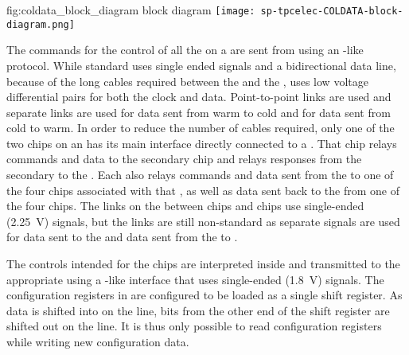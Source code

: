 \begin{dunefigure}
{fig:coldata_block_diagram}
{ block diagram}
\texttt{[image: sp-tpcelec-COLDATA-block-diagram.png]}
\end{dunefigure}

The commands for the control of all the  on a  are sent 
from  using an -like~\cite{i2c} protocol. While standard 
 uses single ended  signals and a bidirectional data 
line, because of the long cables required between the  and the 
,  uses low voltage differential pairs for both 
the  clock and data. Point-to-point links are used and separate 
links are used for data sent from warm to cold and for data sent from cold to 
warm. In order to reduce the number of cables required, only one of the two 
 chips on an  has its main  interface 
directly connected to a . That  chip relays  
commands and data to the secondary  chip and relays  
responses from the secondary  to the . Each 
 also relays  commands and data sent from the 
 to one of the four  chips associated with that 
, as well as data sent back to the  from one of the 
four  chips. The links on the  between  
chips and  chips use single-ended (\SI{2.25}{V})  
signals, but the  links are still non-standard as separate signals 
are used for data sent to the  and data sent from the 
 to .

The controls intended for the   chips are interpreted 
inside  and transmitted to the appropriate  using 
a -like interface that uses single-ended (\SI{1.8}{V})  
signals. The configuration registers in  are configured to be 
loaded as a single shift register. As data is shifted into  on 
the  line, bits from the other end of the shift register are shifted 
out on the  line. It is thus only possible to read  
configuration registers while writing new configuration data.

